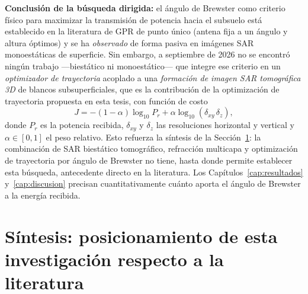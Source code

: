 \documentclass[11pt,a4paper]{report}
\begin{document}
\textbf{Conclusión de la búsqueda dirigida:} el ángulo de Brewster como
criterio físico para maximizar la transmisión de potencia hacia el subsuelo
está establecido en la literatura de GPR de punto único (antena fija a un
ángulo y altura óptimos) y se ha \emph{observado} de forma pasiva en imágenes
SAR monoestáticas de superficie. Sin embargo, a septiembre de 2026 no se
encontró ningún trabajo ---biestático ni monoestático--- que integre ese
criterio en un \emph{optimizador de trayectoria} acoplado a una
\emph{formación de imagen SAR tomográfica 3D} de blancos subsuperficiales,
que es la contribución de la optimización de trayectoria propuesta en esta
tesis, con función de costo
\begin{equation}
  J = -(1-\alpha)\log_{10}P_r + \alpha\log_{10}\left(\delta_{xy}\,\delta_z\right),
\end{equation}
donde $P_r$ es la potencia recibida, $\delta_{xy}$ y $\delta_z$ las
resoluciones horizontal y vertical y $\alpha\in[0,1]$ el peso relativo.
Esto refuerza la síntesis de la Sección~\ref{sec:sintesis}: la combinación
de SAR biestático tomográfico, refracción multicapa y optimización de
trayectoria por ángulo de Brewster no tiene, hasta donde permite establecer
esta búsqueda, antecedente directo en la literatura. Los
Capítulos~\ref{cap:resultados} y~\ref{cap:discusion} precisan
cuantitativamente cuánto aporta el ángulo de Brewster a la energía recibida.

\section{Síntesis: posicionamiento de esta investigación respecto a la literatura}
\label{sec:sintesis}
\end{document}
